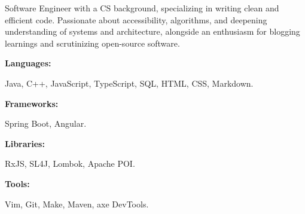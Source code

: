 \documentclass[9pt]{util} %
\begin{document}
\begin{minipage}[t]{0.475\textwidth}
	\vspace{-6pt}
	 
	Software Engineer with a CS background, specializing in writing clean and efficient code. Passionate about accessibility, algorithms, and deepening understanding of systems and architecture, alongside an enthusiasm for blogging learnings and scrutinizing open-source software.
	
\end{minipage}
\hfill %
\begin{minipage}[t]{0.475\textwidth}
	\vspace{-6pt}
	    
	\begin{minipage}[t]{0.2\textwidth}
		\textbf{Languages:}
	\end{minipage}
	\hfill
	\begin{minipage}[t]{0.73\textwidth}
		Java, C++, JavaScript, TypeScript, SQL, HTML, CSS, Markdown.  
	\end{minipage}
	\vspace{1mm}
	    
	\begin{minipage}[t]{0.2\textwidth}
		\textbf{Frameworks:}
	\end{minipage}
	\hfill
	\begin{minipage}[t]{0.73\textwidth}
		Spring Boot, Angular.
	\end{minipage}
	\vspace{1mm}
	    
	\begin{minipage}[t]{0.2\textwidth}
		\textbf{Libraries:}
	\end{minipage}
	\hfill
	\begin{minipage}[t]{0.73\textwidth}
		RxJS, SL4J, Lombok, Apache POI.
	\end{minipage}
	\vspace{1mm}
	       
	\begin{minipage}[t]{0.2\textwidth}
		\textbf{Tools:}
	\end{minipage}
	\hfill
	\begin{minipage}[t]{0.73\textwidth}
		Vim, Git, Make, Maven, axe DevTools.
	\end{minipage}
	\vspace{1mm}
	    
\end{minipage}
\end{document}
